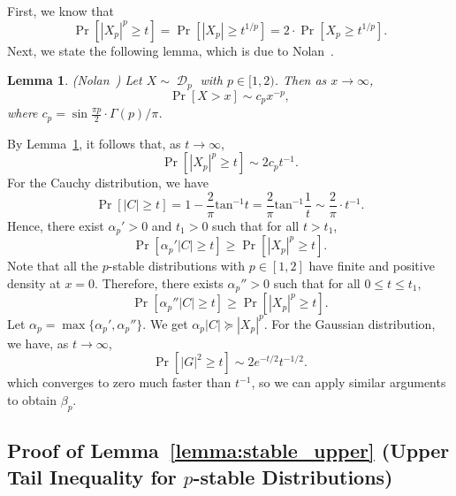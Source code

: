 \documentclass[11pt]{article}
\newtheorem{lemma}{Lemma}
\DeclareMathOperator{\D}{\mathcal{D}}
\begin{document}
First, we know that
\begin{equation*}
  \Pr[|X_p|^p \geq t] = \Pr[|X_p| 
  \geq t^{1/p}] = 2 \cdot \Pr[X_p \geq t^{1/p}].
\end{equation*}
Next, we state the following lemma, which is due to
Nolan~\cite{nolan2012stable}.
\begin{lemma}
  \label{lemma:tail}
  (Nolan~\cite[Thm.~1.12]{nolan2012stable}) Let $X \sim \D_p$ with $p
  \in [1, 2)$.
  Then as $x \to \infty$,
  \begin{equation*}
    \Pr[X > x] \sim c_p x^{-p},
  \end{equation*}
  where $c_p = \sin \frac{\pi p}{2} \cdot \Gamma(p)/\pi$.
\end{lemma}
\noindent
By Lemma~\ref{lemma:tail}, it follows that, as $t \to \infty$,
\begin{equation*}
  \Pr[|X_p|^p \geq t] \sim 2 c_p t^{-1}.
\end{equation*}
For the Cauchy distribution, we have
\begin{equation*}
  \Pr[|C| \geq t] = 1 - \frac{2}{\pi} \text{tan}^{-1} t 
  = \frac{2}{\pi} \text{tan}^{-1} \frac{1}{t} \sim \frac{2}{\pi} \cdot t^{-1}.
\end{equation*}
Hence, there exist $\alpha_p' > 0$ and $t_1 > 0$ such that for all $t > t_1$,
\begin{equation*}
  \Pr[\alpha_p' |C| \geq t] \geq \Pr[|X_p|^p \geq t].
\end{equation*}
Note that all the $p$-stable distributions with $p \in [1, 2]$ have finite and
positive density at $x = 0$.
Therefore, there exists $\alpha_p'' > 0$ such that for all $0 \leq t \leq t_1$,
\begin{equation*}
  \Pr[\alpha_p'' |C| \geq t] \geq \Pr[|X_p|^p \geq t].
\end{equation*}
Let $\alpha_p = \max \{ \alpha_p', \alpha_p'' \}$.
We get $\alpha_p |C| \succeq |X_p|^p$.
For the Gaussian distribution, we have, as $t \to \infty$,
\begin{equation*}
  \Pr[|G|^2 \geq t] \sim 2 e^{-t/2} t^{-1/2}.
\end{equation*}
which converges to zero much faster than $t^{-1}$, so we can apply similar
arguments to obtain $\beta_p$.



\subsection{Proof of Lemma~\ref{lemma:stable_upper} (Upper Tail Inequality for $p$-stable Distributions)}
\label{sxn:pf-lp-stable-upper}
\end{document}
